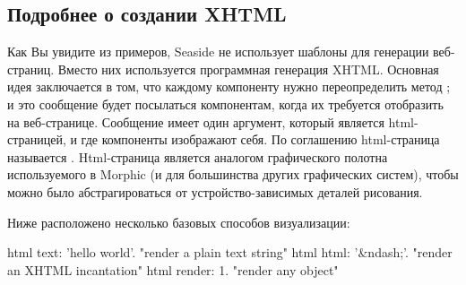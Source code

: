 \documentclass[a4paper,10pt,twoside]{book}
\begin{document}
\subsection{Подробнее о создании XHTML}


Как Вы увидите из примеров, Seaside не использует шаблоны для генерации веб-страниц.
Вместо них используется программная генерация XHTML.
Основная идея заключается в том,
что каждому компоненту нужно переопределить метод
;
и это сообщение будет посылаться компонентам,
когда их требуется отобразить на веб-странице.
Сообщение  имеет один аргумент,
который является   html-страницей,
и где компоненты изображают себя.
По соглашению html-страница называется .
Html-страница является аналогом графического полотна
используемого в Morphic
(и для большинства других графических систем),
чтобы можно было абстрагироваться от устройство-зависимых
деталей рисования.

Ниже расположено несколько базовых способов визуализации:
\begin{code}{}
html text: 'hello world'.  "render a plain text string"
html html: '&ndash;'.     "render an XHTML incantation"
html render: 1.              "render any object"
\end{code}

\end{document}
